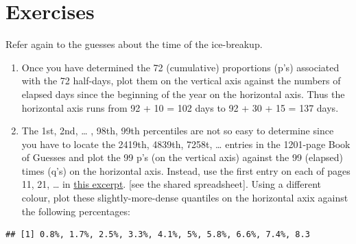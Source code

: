 \documentclass[]{book}
\newenvironment{Shaded}{\begin{snugshade}}{\end{snugshade}}
\newcommand{\DataTypeTok}[1]{\textcolor[rgb]{0.13,0.29,0.53}{#1}}
\newcommand{\DecValTok}[1]{\textcolor[rgb]{0.00,0.00,0.81}{#1}}
\newcommand{\KeywordTok}[1]{\textcolor[rgb]{0.13,0.29,0.53}{\textbf{#1}}}
\newcommand{\NormalTok}[1]{#1}
\newcommand{\OperatorTok}[1]{\textcolor[rgb]{0.81,0.36,0.00}{\textbf{#1}}}
\newcommand{\StringTok}[1]{\textcolor[rgb]{0.31,0.60,0.02}{#1}}
\begin{document}
\hypertarget{exercises-2}{%
\section{Exercises}\label{exercises-2}}

Refer again to the guesses about the time of the ice-breakup.

\begin{enumerate}
\def\labelenumi{\arabic{enumi}.}
\item
  Once you have determined the 72 (cumulative) proportions (p's) associated with the 72 half-days, plot them on the vertical axis against the numbers of elapsed days since the beginning of the year on the horizontal axis. Thus the horizontal axis runs from 92 + 10 = 102 days to 92 + 30 + 15 = 137 days.
\item
  The 1st, 2nd, \ldots{} , 98th, 99th percentiles are not so easy to determine since you have to locate the 2419th, 4839th, 7258t, \ldots{} entries in the 1201-page Book of Guesses and plot the 99 p's (on the vertical axis) against the 99 (elapsed) times (q's) on the horizontal axis. Instead, use the first entry on each of pages 11, 21, \ldots{} in
  \href{http://www.biostat.mcgill.ca/hanley/bios691/SampledPages.pdf}{this excerpt}. {[}see the shared spreadsheet{]}. Using a different colour, plot these slightly-more-dense quantiles on the horizontal axix against the following percentages:
\end{enumerate}

\begin{Shaded}
\end{Shaded}

\begin{verbatim}
## [1] 0.8%, 1.7%, 2.5%, 3.3%, 4.1%, 5%, 5.8%, 6.6%, 7.4%, 8.3
\end{verbatim}
\end{document}
